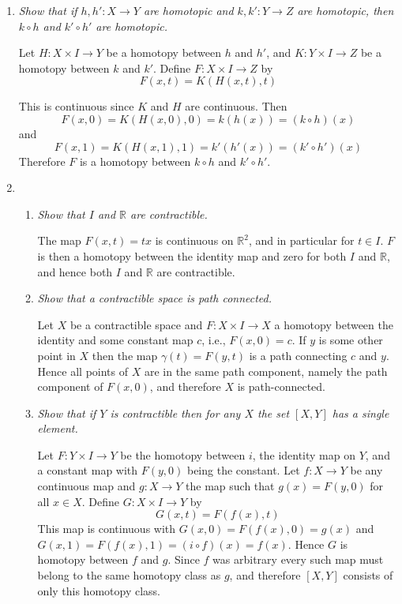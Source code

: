 \documentclass[10pt]{article}
\newcommand{\R}{\mathbb{R}}
\begin{document}
\begin{enumerate}
\item \emph{Show that if $h,h': X \rightarrow Y$ are homotopic and $k,k': Y \rightarrow Z$ are homotopic, then $k \circ h$ and $k' \circ h'$ are homotopic.}

Let $H: X \times I \rightarrow Y$ be a homotopy between $h$ and $h'$, and $K: Y \times I \rightarrow Z$ be a homotopy between $k$ and $k'$.  Define $F: X \times I \rightarrow Z$  by $$F(x,t) = K(H(x,t), t)$$

This is continuous since $K$ and $H$ are continuous.  Then $$F(x,0) = K(H(x,0), 0) = k(h(x)) = (k \circ h)(x)$$ and $$F(x,1) = K(H(x,1),1) = k'(h'(x)) = (k' \circ h')(x)$$  Therefore $F$ is a homotopy between $k \circ h$ and $k' \circ h'$.

\item
\begin{enumerate}
\item \emph{Show that $I$ and $\R$ are contractible.}

The map $F(x,t) = tx$ is continuous on $\R^2$, and in particular for $t \in I$.  $F$ is then a homotopy between the identity map and zero for both $I$ and $\R$, and hence both $I$ and $\R$ are contractible.

\item \emph{Show that a contractible space is path connected.}

Let $X$ be a contractible space and $F: X \times I \rightarrow X$ a homotopy between the identity and some constant map $c$, i.e., $F(x,0) = c$.  If $y$ is some other point in $X$ then the map $\gamma(t) = F(y,t)$ is a path connecting $c$ and $y$.  Hence all points of $X$ are in the same path component, namely the path component of $F(x,0)$, and therefore $X$ is path-connected.

\item \emph{Show that if $Y$ is contractible then for any $X$ the set $[X,Y]$ has a single element.}

Let $F: Y \times I \rightarrow Y$ be the homotopy between $i$, the identity map on $Y$, and a constant map with $F(y,0)$ being the constant.  Let $f: X \rightarrow Y$ be any continuous map and $g: X \rightarrow Y$ the map such that $g(x) = F(y,0)$ for all $x \in X$.  Define $G: X \times I \rightarrow Y$ by $$G(x,t) = F(f(x), t)$$  This map is continuous with $G(x,0) = F(f(x), 0) = g(x)$ and $G(x,1) = F(f(x),1) = (i \circ f)(x) = f(x)$.  Hence $G$ is homotopy between $f$ and $g$.  Since $f$ was arbitrary every such map must belong to the same homotopy class as $g$, and therefore $[X,Y]$ consists of only this homotopy class.


\end{enumerate}
\end{enumerate}
\end{document}
